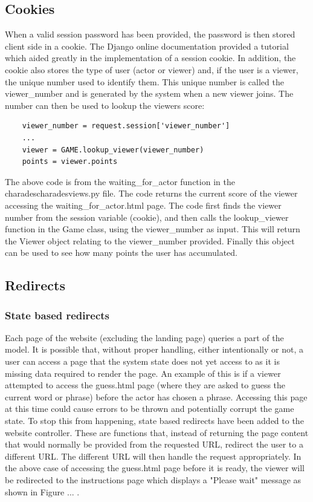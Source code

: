 \subsection{Cookies}
When a valid session password has been provided, the password is then stored client side in a cookie. The Django online documentation \cite{django_cookies} provided a tutorial which aided greatly in the implementation of a session cookie. In addition, the cookie also stores the type of user (actor or viewer) and, if the user is a viewer, the unique number used to identify them. This unique number is called the viewer\_number and is generated by the system when a new viewer joins. The number can then be used to lookup the viewers score:

\begin{verbatim}
	viewer_number = request.session['viewer_number']
	...
	viewer = GAME.lookup_viewer(viewer_number)
	points = viewer.points
\end{verbatim}

The above code is from the waiting\_for\_actor function in the \/charades\/charades\/views.py file. The code returns the current score of the viewer accessing the waiting\_for\_actor.html page. The code first finds the viewer number from the session variable (cookie), and then calls the lookup\_viewer function in the Game class, using the viewer\_number as input. This will return the Viewer object relating to the viewer\_number provided. Finally this object can be used to see how many points the user has accumulated.

\subsection{Redirects}
\subsubsection{State based redirects}
Each page of the website (excluding the landing page) queries a part of the model. It is possible that, without proper handling, either intentionally or not, a user can access a page that the system state does not yet access to as it is missing data required to render the page. An example of this is if a viewer attempted to access the guess.html page (where they are asked to guess the current word or phrase) before the actor has chosen a phrase. Accessing this page at this time could cause errors to be thrown and potentially corrupt the game state. To stop this from happening, state based redirects have been added to the website controller. These are functions that, instead of returning the page content that would normally be provided from the requested URL, redirect the user to a different URL. The different URL will then handle the request appropriately. In the above case of accessing the guess.html page before it is ready, the viewer will be redirected to the instructions page which displays a "Please wait" message as shown in Figure ... .


